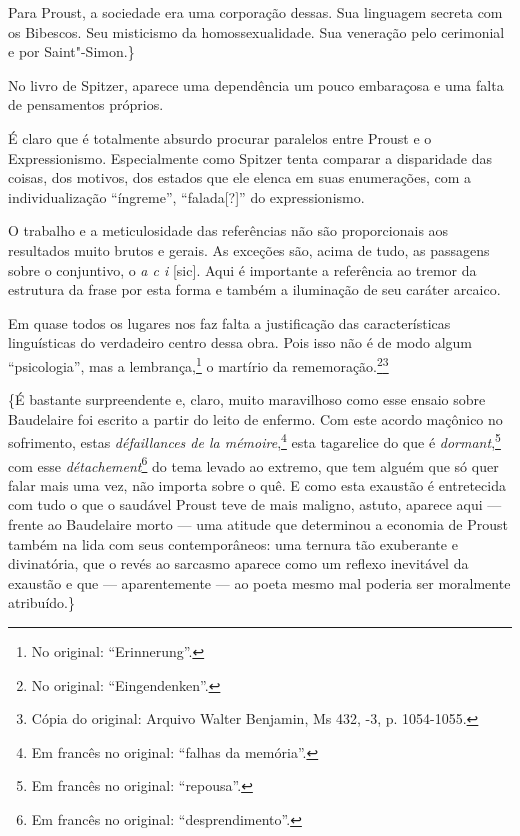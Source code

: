 Para Proust, a sociedade era uma corporação dessas. Sua linguagem
secreta com os Bibescos. Seu misticismo da homossexualidade. Sua
veneração pelo cerimonial e por Saint"-Simon.\}

No livro de Spitzer, aparece uma dependência um pouco embaraçosa e uma
falta de pensamentos próprios.

É claro que é totalmente absurdo procurar paralelos entre Proust e o
Expressionismo. Especialmente como Spitzer tenta comparar a disparidade
das coisas, dos motivos, dos estados que ele elenca em suas enumerações,
com a individualização ``íngreme'', ``falada{[}?{]}'' do expressionismo.

O trabalho e a meticulosidade das referências não são proporcionais aos
resultados muito brutos e gerais. As exceções são, acima de tudo, as
passagens sobre o conjuntivo, o \emph{a c i} {[}sic{]}. Aqui é
importante a referência ao tremor da estrutura da frase por esta forma e
também a iluminação de seu caráter arcaico.

Em quase todos os lugares nos faz falta a justificação das
características linguísticas do verdadeiro centro dessa obra. Pois isso
não é de modo algum ``psicologia'', mas a lembrança,\footnote{No
  original: ``Erinnerung''. \versal{[N. T.]}} o martírio da rememoração.\footnote{No original: ``Eingendenken''. \versal{[N. T.]}}\footnote{Cópia do original: Arquivo Walter Benjamin, Ms 432, -3, p. 1054-1055.}

\{É bastante surpreendente e, claro, muito maravilhoso como esse ensaio
sobre Baudelaire foi escrito a partir do leito de enfermo. Com este
acordo maçônico no sofrimento, estas \emph{défaillances de la mémoire},\footnote{Em francês no original: ``falhas da memória''. \versal{[N. T.]}} esta
tagarelice do que é \emph{dormant},\footnote{Em francês no
  original: ``repousa''. \versal{[N. T.]}} com esse \emph{détachement}\footnote{Em francês no original: ``desprendimento''. \versal{[N. T.]}} do tema levado ao
extremo, que tem alguém que só quer falar mais uma vez, não importa
sobre o quê. E como esta exaustão é entretecida com tudo o que o
saudável Proust teve de mais maligno, astuto, aparece aqui --- frente ao
Baudelaire morto --- uma atitude que determinou a economia de Proust
também na lida com seus contemporâneos: uma ternura tão exuberante e
divinatória, que o revés ao sarcasmo aparece como um reflexo inevitável
da exaustão e que --- aparentemente --- ao poeta mesmo mal poderia ser
moralmente atribuído.\}

